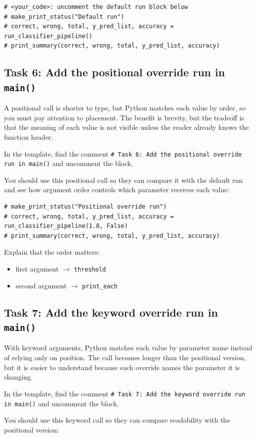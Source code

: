\begin{verbatim}
# <your_code>: uncomment the default run block below
# make_print_status("Default run")
# correct, wrong, total, y_pred_list, accuracy = run_classifier_pipeline()
# print_summary(correct, wrong, total, y_pred_list, accuracy)
\end{verbatim}

\subsection{Task 6: Add the positional override run in \texttt{main()}}
A positional call is shorter to type, but Python matches each value by order, so you must pay attention to placement. The benefit is brevity, but the tradeoff is that the meaning of each value is not visible unless the reader already knows the function header.
\begin{tcolorbox}[title=Task 6: Add the positional override run in \texttt{main()}]
In the template, find the comment \texttt{\# Task 6: Add the positional override run in main()} and uncomment the block.

You should use this positional call so they can compare it with the default run and see how argument order controls which parameter receives each value:
\end{tcolorbox}

\begin{verbatim}
# make_print_status("Positional override run")
# correct, wrong, total, y_pred_list, accuracy = run_classifier_pipeline(1.8, False)
# print_summary(correct, wrong, total, y_pred_list, accuracy)
\end{verbatim}

Explain that the order matters:
\begin{itemize}
    \item first argument $\rightarrow$ \texttt{threshold}
    \item second argument $\rightarrow$ \texttt{print\_each}
\end{itemize}

\subsection{Task 7: Add the keyword override run in \texttt{main()}}
With keyword arguments, Python matches each value by parameter name instead of relying only on position. The call becomes longer than the positional version, but it is easier to understand because each override names the parameter it is changing.
\begin{tcolorbox}[title=Task 7: Add the keyword override run in \texttt{main()}]
In the template, find the comment \texttt{\# Task 7: Add the keyword override run in main()} and uncomment the block.

You should use this keyword call so they can compare readability with the positional version:
\end{tcolorbox}

